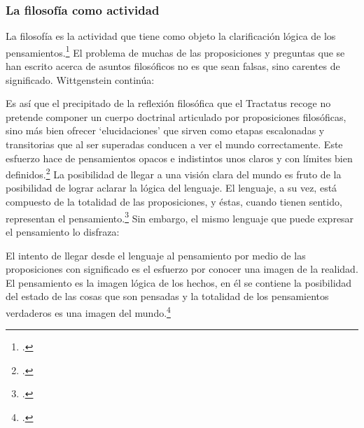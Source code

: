     \subsubsection{La filosofía como actividad}

    La filosofía es la actividad que tiene como objeto la clarificación lógica
    de los pensamientos.\footcite[4.112 p. 52]{tractatus} El problema de muchas de
    las proposiciones y preguntas que se han escrito acerca de asuntos filosóficos
    no es que sean falsas, sino carentes de significado. Wittgenstein continúa: 

    Es así que el precipitado de la reflexión filosófica que el Tractatus recoge no
    pretende componer un cuerpo doctrinal articulado por proposiciones filosóficas,
    sino más bien ofrecer `elucidaciones' que sirven como etapas escalonadas y
    transitorias que al ser superadas conducen a ver el mundo correctamente. Este
    esfuerzo hace de pensamientos opacos e indistintos unos claros y con límites
    bien definidos.\footcite[cf. 4.112 y 6.54]{tractatus} 
    La posibilidad de llegar a una visión clara del mundo es fruto de la posibilidad
    de lograr aclarar la lógica del lenguaje. El lenguaje, a su vez, está compuesto
    de la totalidad de las proposiciones, y éstas, cuando tienen sentido,
    representan el pensamiento.\footcite[cf. 4 y 4.001]{tractatus} 
    Sin embargo, el mismo lenguaje que puede expresar el pensamiento lo disfraza:


    El intento de llegar desde el lenguaje al pensamiento por medio de las
    proposiciones con significado es el esfuerzo por conocer una imagen de la
    realidad. El pensamiento es la imagen lógica de los hechos, en él se contiene la
    posibilidad del estado de las cosas que son pensadas y la totalidad de los
    pensamientos verdaderos es una imagen del mundo.\footcite[cf.][3 y
    3.001]{tractatus}

